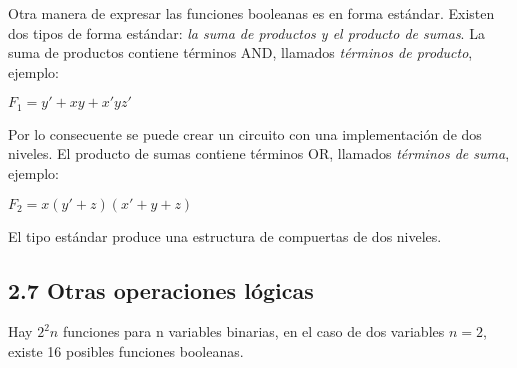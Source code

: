 Otra manera de expresar las funciones booleanas es en forma est\'{a}ndar.
Existen dos tipos de forma est\'{a}ndar: \textit{la suma de productos y el
    producto de sumas}. La suma de productos contiene t\'{e}rminos AND, llamados
\textit{t\'{e}rminos de producto}, ejemplo: \begin{center} $F_1 = y' + xy +
        x'yz'$ \end{center} Por lo consecuente se puede crear un circuito con una
implementaci\'{o}n de dos niveles. El producto de sumas contiene t\'{e}rminos OR,
llamados \textit{t\'{e}rminos de suma}, ejemplo: \begin{center} $F_2 = x(y' +
        z)(x' + y + z)$ \end{center} El tipo est\'{a}ndar produce una estructura de
compuertas de dos niveles.

\subsection*{2.7 Otras operaciones l\'{o}gicas} Hay $2^2n$ funciones para n
variables binarias, en el caso de dos variables $n = 2$, existe 16 posibles
funciones booleanas.

